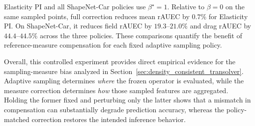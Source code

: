 

Elasticity PI and all ShapeNet-Car policies use $\beta^\star=1$.
Relative to $\beta=0$ on the same sampled points, full correction reduces
mean rAUEC by $0.7\%$ for Elasticity PI. On ShapeNet-Car, it reduces field
rAUEC by $19.3$--$21.0\%$ and drag rAUEC by $44.4$--$44.5\%$ across the
three policies. These comparisons quantify the benefit of reference-measure
compensation for each fixed adaptive sampling policy.

Overall, this controlled experiment provides direct empirical evidence
for the sampling-measure bias analyzed in
Section~\ref{sec:density_consistent_transolver}. Adaptive sampling
determines \emph{where} the frozen operator is evaluated, while the
measure correction determines \emph{how} those sampled features are
aggregated. Holding the former fixed and perturbing only the latter
shows that a mismatch in compensation can substantially degrade
prediction accuracy, whereas the policy-matched correction restores the
intended inference behavior.
